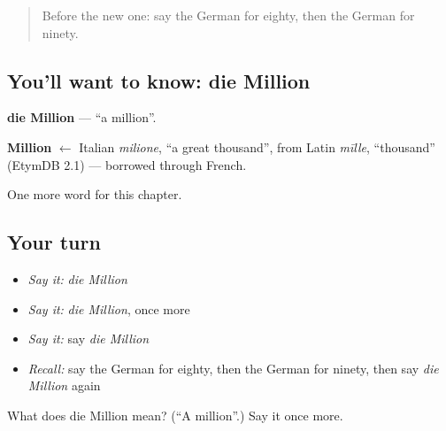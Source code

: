 \begin{quote}
Before the new one: say the German for eighty, then the German for ninety.
\end{quote}

\subsection*{You'll want to know: die Million}
\textbf{die Million} — \textquotedblleft{}a million\textquotedblright{}.

\begin{cousinweb}
\textbf{Million} $\leftarrow$ Italian \emph{milione}, \textquotedblleft{}a great thousand\textquotedblright{}, from Latin \emph{mīlle}, \textquotedblleft{}thousand\textquotedblright{} (EtymDB 2.1) — borrowed through French.
\end{cousinweb}

\begin{grammarlens}[title={What you've built}]
One more word for this chapter.
\end{grammarlens}

\subsection*{Your turn}
\begin{itemize}
\raggedright
  \item \emph{Say it:} \emph{die Million}
  \item \emph{Say it:} \emph{die Million}, once more
  \item \emph{Say it:} say \emph{die Million}
  \item \emph{Recall:} say the German for eighty, then the German for ninety, then say \emph{die Million} again
\end{itemize}

\begin{tcolorbox}[breakable,colback=teal!4,colframe=teal!35!black,title={Before you move on}]
What does die Million mean? (\textquotedblleft{}A million\textquotedblright{}.) Say it once more.
\end{tcolorbox}
